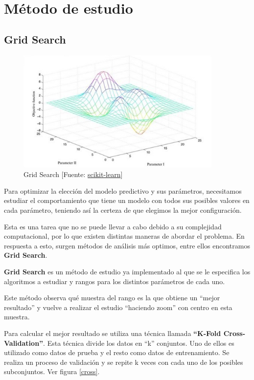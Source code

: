 \section{Método de estudio}
\label{makereference4.4}
	\subsection{Grid Search}

	\begin{figure}[htb]
		\begin{center}
			\includegraphics[width=4in]{figures/grid_search.png}
			\caption{Grid Search [Fuente: \href{www.scikit-learn.org}{scikit-learn}]}
		\end{center}
		\label{grid}
	\end{figure}

	Para optimizar la elección del modelo predictivo y sus parámetros, necesitamos estudiar el comportamiento que tiene un modelo con todos sus posibles valores en cada parámetro, teniendo así la certeza de que elegimos la mejor configuración.

	Esta es una tarea que no se puede llevar a cabo debido a su complejidad computacional, por lo que existen distintas maneras de abordar el problema. En respuesta a esto, surgen métodos de análisis más optimos, entre ellos encontramos \textbf{Grid Search}.

	\textbf{Grid Search} es un método de estudio ya implementado al que se le especifica los algoritmos a estudiar y rangos para los distintos parámetros de cada uno. 

	Este método observa qué muestra del rango es la que obtiene un ``mejor resultado'' y vuelve a realizar el estudio ``haciendo zoom'' con centro en esta muestra.

	Para calcular el mejor resultado se utiliza una técnica llamada \textbf{``K-Fold Cross-Validation''}. Esta técnica divide los datos en ``k'' conjuntos. Uno de ellos es utilizado como datos de prueba y el resto como datos de entrenamiento. Se realiza un proceso de validación y se repite k veces con cada uno de los posibles subconjuntos. Ver figura \ref{cross}.

